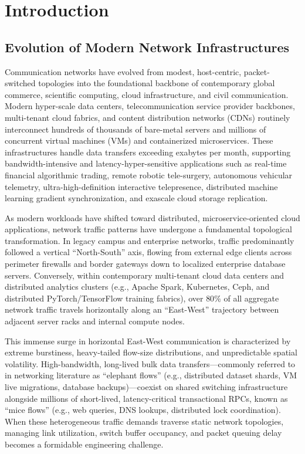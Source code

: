 \chapter{Introduction}
\label{chap:intro}

\section{Evolution of Modern Network Infrastructures}
Communication networks have evolved from modest, host-centric, packet-switched topologies into the foundational backbone of contemporary global commerce, scientific computing, cloud infrastructure, and civil communication. Modern hyper-scale data centers, telecommunication service provider backbones, multi-tenant cloud fabrics, and content distribution networks (CDNs) routinely interconnect hundreds of thousands of bare-metal servers and millions of concurrent virtual machines (VMs) and containerized microservices. These infrastructures handle data transfers exceeding exabytes per month, supporting bandwidth-intensive and latency-hyper-sensitive applications such as real-time financial algorithmic trading, remote robotic tele-surgery, autonomous vehicular telemetry, ultra-high-definition interactive telepresence, distributed machine learning gradient synchronization, and exascale cloud storage replication.

As modern workloads have shifted toward distributed, microservice-oriented cloud applications, network traffic patterns have undergone a fundamental topological transformation. In legacy campus and enterprise networks, traffic predominantly followed a vertical ``North-South'' axis, flowing from external edge clients across perimeter firewalls and border gateways down to localized enterprise database servers. Conversely, within contemporary multi-tenant cloud data centers and distributed analytics clusters (e.g., Apache Spark, Kubernetes, Ceph, and distributed PyTorch/TensorFlow training fabrics), over $80\%$ of all aggregate network traffic travels horizontally along an ``East-West'' trajectory between adjacent server racks and internal compute nodes.

This immense surge in horizontal East-West communication is characterized by extreme burstiness, heavy-tailed flow-size distributions, and unpredictable spatial volatility. High-bandwidth, long-lived bulk data transfers---commonly referred to in networking literature as ``elephant flows'' (e.g., distributed dataset shards, VM live migrations, database backups)---coexist on shared switching infrastructure alongside millions of short-lived, latency-critical transactional RPCs, known as ``mice flows'' (e.g., web queries, DNS lookups, distributed lock coordination). When these heterogeneous traffic demands traverse static network topologies, managing link utilization, switch buffer occupancy, and packet queuing delay becomes a formidable engineering challenge.

